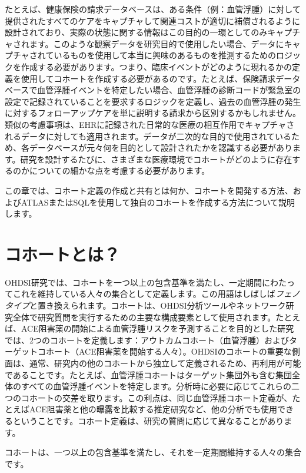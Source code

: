 \documentclass[
  11pt]{book}
\makeatletter
\newenvironment{kframe}{%
\medskip{}
\setlength{\fboxsep}{.8em}
 \def\at@end@of@kframe{}%
 \ifinner\ifhmode%
  \def\at@end@of@kframe{\end{minipage}}%
  \begin{minipage}{\columnwidth}%
 \fi\fi%
 \def\FrameCommand##1{\hskip\@totalleftmargin \hskip-\fboxsep
 \colorbox{myShadeColor}{##1}\hskip-\fboxsep
     \hskip-\linewidth \hskip-\@totalleftmargin \hskip\columnwidth}%
 \MakeFramed {\advance\hsize-\width
   \@totalleftmargin\z@ \linewidth\hsize
   \@setminipage}}%
 {\par\unskip\endMakeFramed%
 \at@end@of@kframe}
\newenvironment{rmdblock}[1]
  {
  \begin{itemize}
  \renewcommand{\labelitemi}{
    \raisebox{-.7\height}[0pt][0pt]{
      {\setkeys{Gin}{width=3em,keepaspectratio}\texttt{[image: images/\#1]}}
    }
  }
  \setlength{\fboxsep}{1em}
  \begin{kframe}
  \item
  }
  {
  \end{kframe}
  \end{itemize}
  }
\newenvironment{rmdimportant}
  {\begin{rmdblock}{important}}
  {\end{rmdblock}}
\theoremstyle{definition}
\theoremstyle{definition}
\theoremstyle{definition}
\theoremstyle{definition}
\theoremstyle{remark}
\makeatother
\begin{document}
たとえば、健康保険の請求データベースは、ある条件（例：血管浮腫）に対して提供されたすべてのケアをキャプチャして関連コストが適切に補償されるように設計されており、実際の状態に関する情報はこの目的の一環としてのみキャプチャされます。このような観察データを研究目的で使用したい場合、データにキャプチャされているものを使用して本当に興味のあるものを推測するためのロジックを作成する必要があります。つまり、臨床イベントがどのように現れるかの定義を使用してコホートを作成する必要があるのです。たとえば、保険請求データベースで血管浮腫イベントを特定したい場合、血管浮腫の診断コードが緊急室の設定で記録されていることを要求するロジックを定義し、過去の血管浮腫の発生に対するフォローアップケアを単に説明する請求から区別するかもしれません。類似の考慮事項は、EHRに記録された日常的な医療の相互作用でキャプチャされるデータに対しても適用されます。データが二次的な目的で使用されているため、各データベースが元々何を目的として設計されたかを認識する必要があります。研究を設計するたびに、さまざまな医療環境でコホートがどのように存在するのかについての細かな点を考慮する必要があります。

この章では、コホート定義の作成と共有とは何か、コホートを開発する方法、およびATLASまたはSQLを使用して独自のコホートを作成する方法について説明します。

\section{コホートとは？}\label{ux30b3ux30dbux30fcux30c8ux3068ux306f}

OHDSI研究では、コホートを一つ以上の包含基準を満たし、一定期間にわたってこれを維持している人々の集合として定義します。この用語はしばしば\emph{フェノタイプ}と置き換えられます。コホートは、OHDSI分析ツールやネットワーク研究全体で研究質問を実行するための主要な構成要素として使用されます。たとえば、ACE阻害薬の開始による血管浮腫リスクを予測することを目的とした研究では、2つのコホートを定義します：アウトカムコホート（血管浮腫）およびターゲットコホート（ACE阻害薬を開始する人々）。OHDSIのコホートの重要な側面は、通常、研究内の他のコホートから独立して定義されるため、再利用が可能であることです。たとえば、血管浮腫コホートはターゲット集団外も含む集団全体のすべての血管浮腫イベントを特定します。分析時に必要に応じてこれらの二つのコホートの交差を取ります。この利点は、同じ血管浮腫コホート定義が、たとえばACE阻害薬と他の曝露を比較する推定研究など、他の分析でも使用できるということです。コホート定義は、研究の質問に応じて異なることがあります。

\begin{rmdimportant}
コホートは、一つ以上の包含基準を満たし、それを一定期間維持する人々の集合です。
\end{rmdimportant}
\end{document}
